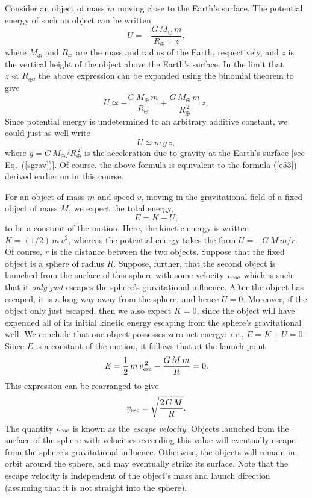 Consider an object of mass $m$ moving close to the Earth's surface. The potential
energy of such an object can be written
\begin{equation}
U = -\frac{G\,M_\oplus\,m}{R_\oplus +z},
\end{equation}
where $M_\oplus$ and ${R_\oplus}$ are the mass and radius of the Earth, respectively, and
$z$ is the vertical height of the object above the Earth's surface. In the limit that
$z\ll R_\oplus$, the above expression can be expanded using the binomial theorem
to give
\begin{equation}
U \simeq -\frac{G\,M_\oplus\,m}{R_\oplus} + \frac{G\,M_\oplus\,m}{R_\oplus^{\,2}}\,z,
\end{equation}
Since potential energy is undetermined to an arbitrary additive constant, we could just as
well write
\begin{equation}
U \simeq m\,g\,z,
\end{equation}
where $g = G\,M_\oplus/R_\oplus^{\,2}$ is the acceleration due to gravity at
the Earth's surface [see Eq.~(\ref{sgrav})]. Of course, the above formula is equivalent
to the formula (\ref{e53}) derived earlier on  in this course.

For an object of mass $m$ and speed $v$, moving in the gravitational field of a fixed object
of mass $M$, we expect the total energy,
\begin{equation}
E = K + U,
\end{equation}
to be a constant of the motion. Here, the kinetic energy is written $K = (1/2)\,m\,v^2$, whereas
the potential energy takes the form $U= - G\,M\,m/r$. Of course, $r$ is the distance between the
two objects. Suppose that the fixed object is a sphere of radius $R$. Suppose,
further, that the second object is launched from the surface of this sphere
with some velocity $v_{\rm esc}$ which is such that it {\em only just} escapes the sphere's gravitational
influence. After the object has escaped, it is a long way away from the sphere, and hence 
$U=0$. Moreover, if the object only just escaped, then we also expect $K=0$, since the
object will have expended all of its initial kinetic energy escaping from the sphere's
gravitational well. We conclude that our object possesses zero net energy: 
{\em i.e.}, $E = K+U = 0$. Since $E$ is a constant of the motion, it follows
 that at the launch point
\begin{equation}
E = \frac{1}{2}\,m\,v_{\rm esc}^{\,2} - \frac{G\,M\,m}{R} = 0.
\end{equation}
This expression can be rearranged to give
\begin{equation}
v_{\rm esc} = \sqrt{\frac{2\,G\,M}{R}}.
\end{equation}
The quantity $v_{\rm esc}$ is known as the {\em escape velocity}. Objects launched from
the surface of the sphere with velocities exceeding this value will eventually
escape from the sphere's gravitational influence. Otherwise, the objects
will remain in orbit around the sphere, and may eventually strike its surface.
Note that the escape velocity is independent of the object's mass and launch
direction (assuming that it is not straight into the sphere). 

